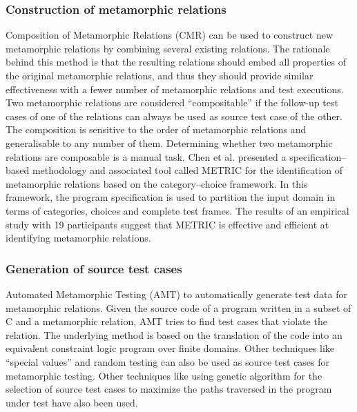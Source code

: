 		\subsubsection{Construction of metamorphic relations}
		Composition of Metamorphic Relations (CMR) can be used to construct new metamorphic relations by combining several existing relations. The rationale behind this method is that the resulting relations should embed all properties of the original metamorphic relations, and thus they should provide similar effectiveness with a fewer number of metamorphic relations and test executions. Two metamorphic relations are considered “compositable” if the follow-up test cases of one of the relations can always be used as source test case of the other. The composition is sensitive to the order of metamorphic relations and generalisable to any number of them. Determining whether two metamorphic relations are composable is a manual task. Chen et al. \cite{} presented a specification–based methodology and associated tool called METRIC for the identification of metamorphic relations based on the category–choice framework. In this framework, the program specification is used to partition the input domain in terms of categories, choices and complete test frames. The results of an empirical study with 19 participants suggest that METRIC is effective and efficient at identifying metamorphic relations.
		\subsubsection{Generation of source test cases}
		Automated Metamorphic Testing (AMT) to automatically generate test data for metamorphic relations. Given the source code of a program written in a subset of C and a metamorphic relation, AMT tries to find test cases that violate the relation. The underlying method is based on the translation of the code into an equivalent constraint logic program over finite domains. Other techniques like “special values” and random testing can also be used as source test cases for metamorphic testing. Other techniques like using genetic algorithm for the selection of source test cases to maximize the paths traversed in the program under test have also been used.
